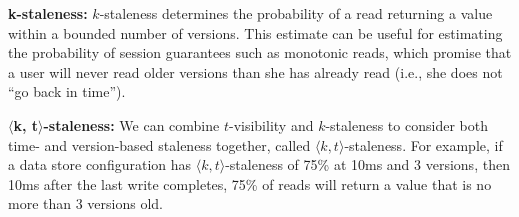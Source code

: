 \textbf{k-staleness:} $k$-staleness determines the probability of a
read returning a value within a bounded number of versions. This
estimate can be useful for estimating the probability of session
guarantees such as monotonic reads, which promise that a user will
never read older versions than she has already read (i.e., she does
not ``go back in time'').

\textbf{$\langle$k, t$\rangle$-staleness:} We can combine $t$-visibility
and $k$-staleness to consider both time- and version-based staleness
together, called $\langle k, t \rangle$-staleness. For example, if a
data store configuration has $\langle k, t \rangle$-staleness of 75\%
at 10ms and 3 versions, then 10ms after the last write completes, 75\%
of reads will return a value that is no more than 3 versions old.



